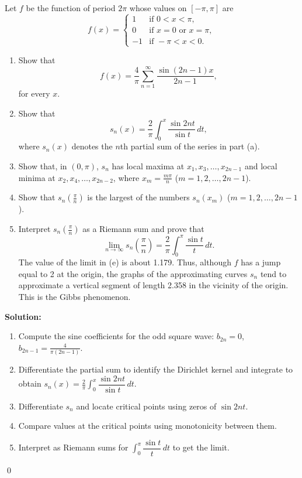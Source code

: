 \begin{problembox}
Let $f$ be the function of period $2\pi$ whose values on $[-\pi, \pi]$ are
\[
f(x) = 
\begin{cases} 
1 & \text{if } 0 < x < \pi, \\
0 & \text{if } x = 0 \text{ or } x = \pi, \\
-1 & \text{if } -\pi < x < 0.
\end{cases}
\]
\begin{enumerate}[label=(\alph*)]
\item Show that
\[
f(x) = \frac{4}{\pi} \sum_{n=1}^\infty \frac{\sin (2n - 1)x}{2n - 1},
\]
for every $x$.
\item Show that
\[
s_n(x) = \frac{2}{\pi} \int_0^x \frac{\sin 2nt}{\sin t} \, dt,
\]
where $s_n(x)$ denotes the $n$th partial sum of the series in part (a).
\item Show that, in $(0, \pi)$, $s_n$ has local maxima at $x_1, x_3, \dots, x_{2n-1}$ and local minima at $x_2, x_4, \dots, x_{2n-2}$, where $x_m = \frac{m\pi}{n}$ ($m = 1, 2, \dots, 2n - 1$).
\item Show that $s_n\left(\frac{\pi}{n}\right)$ is the largest of the numbers $s_n(x_m)$ ($m = 1, 2, \dots, 2n - 1$).
\item Interpret $s_n\left(\frac{\pi}{n}\right)$ as a Riemann sum and prove that
\[
\lim_{n \to \infty} s_n\left(\frac{\pi}{n}\right) = \frac{2}{\pi} \int_0^\pi \frac{\sin t}{t} \, dt.
\]
The value of the limit in (e) is about 1.179. Thus, although $f$ has a jump equal to 2 at the origin, the graphs of the approximating curves $s_n$ tend to approximate a vertical segment of length 2.358 in the vicinity of the origin. This is the Gibbs phenomenon.
\end{enumerate}
\end{problembox}

\noindent\textbf{Solution:}
\begin{enumerate}[label=(\alph*)]
\item Compute the sine coefficients for the odd square wave: $b_{2n}=0$, $b_{2n-1}=\tfrac{4}{\pi(2n-1)}$.
\item Differentiate the partial sum to identify the Dirichlet kernel and integrate to obtain $s_n(x)=\tfrac{2}{\pi}\int_0^x \dfrac{\sin 2nt}{\sin t}\,dt$.
\item Differentiate $s_n$ and locate critical points using zeros of $\sin 2nt$.
\item Compare values at the critical points using monotonicity between them.
\item Interpret as Riemann sums for $\int_0^{\pi} \dfrac{\sin t}{t}\,dt$ to get the limit.
\end{enumerate}\qed


